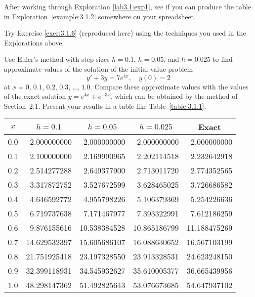 \documentclass{ximera}
\begin{document}
\begin{problem}\label{exer:3.1.1L}
After working through Exploration \ref{lab3.1:exp1}, see if you can produce the table in Exploration~\ref{example:3.1.2} somewhere on your spreadsheet.
\end{problem}

\begin{problem}\label{exer:3.1.6L} 
Try Exercise \ref{exer:3.1.6} (reproduced here) using the techniques you used in the Explorations above.

Use Euler's method with step sizes $h=0.1$, $h=0.05$, and $h=0.025$ to
find approximate values of the solution of the initial value problem
$$
y'+3y=7e^{4x},\quad y(0)=2
$$
at $x=0$, $0.1$, $0.2$, $0.3$, \dots, $1.0$. Compare these approximate values with the values of the exact solution $y=e^{4x}+e^{-3x}$, which can be obtained by the method of Section~2.1. Present your results in a table like Table~\ref{table:3.1.1}.

\begin{solution}
    {\small
\begin{tabular}{|c|r|r|r|r|}\hline
\multicolumn{1}{|c|}{$x$}&
\multicolumn{1}{|c|}{$h=0.1$}&
\multicolumn{1}{|c|}{$h=0.05$}&
\multicolumn{1}{|c|}{$h=0.025$}&
\multicolumn{1}{|c|}{Exact}\\ \hline
0.0 &  2.000000000 &   2.000000000 &  2.000000000 &   2.000000000 \\
0.1 &  2.100000000 &   2.169990965 &  2.202114518 &   2.232642918 \\
0.2 &  2.514277288 &   2.649377900 &  2.713011720 &   2.774352565 \\
0.3 &  3.317872752 &   3.527672599 &  3.628465025 &   3.726686582 \\
0.4 &  4.646592772 &   4.955798226 &  5.106379369 &   5.254226636 \\
0.5 &  6.719737638 &   7.171467977 &  7.393322991 &   7.612186259 \\
0.6 &  9.876155616 &  10.538384528 & 10.865186799 &  11.188475269 \\
0.7 & 14.629532397 &  15.605686107 & 16.088630652 &  16.567103199 \\
0.8 & 21.751925418 &  23.197328550 & 23.913328531 &  24.623248150 \\
0.9 & 32.399118931 &  34.545932627 & 35.610005377 &  36.665439956 \\
1.0 & 48.298147362 &  51.492825643 & 53.076673685 &  54.647937102 \\
\hline
\end{tabular}}
\end{solution}
\end{problem}


 
 




 
\end{document}
